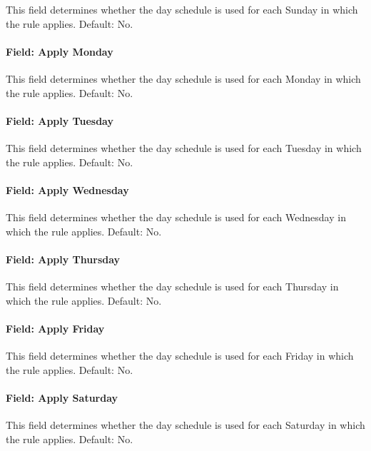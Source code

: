 This field determines whether the day schedule is used for each Sunday in which the rule applies.
Default: No.

\paragraph{Field: Apply Monday}\label{field-apply-monday-scheduleweekrule}

This field determines whether the day schedule is used for each Monday in which the rule applies.
Default: No.

\paragraph{Field: Apply Tuesday}\label{field-apply-tuesday-scheduleweekrule}

This field determines whether the day schedule is used for each Tuesday in which the rule applies.
Default: No.

\paragraph{Field: Apply Wednesday}\label{field-apply-wednesday-scheduleweekrule}

This field determines whether the day schedule is used for each Wednesday in which the rule applies.
Default: No.

\paragraph{Field: Apply Thursday}\label{field-apply-thursday-scheduleweekrule}

This field determines whether the day schedule is used for each Thursday in which the rule applies.
Default: No.

\paragraph{Field: Apply Friday}\label{field-apply-friday-scheduleweekrule}

This field determines whether the day schedule is used for each Friday in which the rule applies.
Default: No.

\paragraph{Field: Apply Saturday}\label{field-apply-saturday-scheduleweekrule}

This field determines whether the day schedule is used for each Saturday in which the rule applies.
Default: No.

